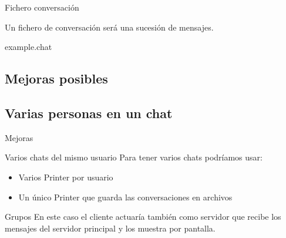 

\begin{frame}{Fichero conversación}
	\begin{block}{ }
		Un fichero de conversación será una sucesión de mensajes.
	\end{block}
	
	\begin{exampleblock}{example.chat}
		\begin{figure}[H]
		
		\end{figure}
	\end{exampleblock}
\end{frame}



\subsection{Mejoras posibles}
\subsection{Varias personas en un chat}
\begin{frame}{Mejoras}
	\begin{block}{Varios chats del mismo usuario}
		Para tener varios chats podríamos usar:
		
		\begin{itemize}
			\item Varios Printer por usuario
			\item Un único Printer que guarda las conversaciones en archivos
		\end{itemize}
	\end{block}
	
	\begin{block}{Grupos}   
		En este caso el cliente actuaría también como servidor que recibe los mensajes del servidor principal y los muestra por pantalla.
	\end{block}
\end{frame}


